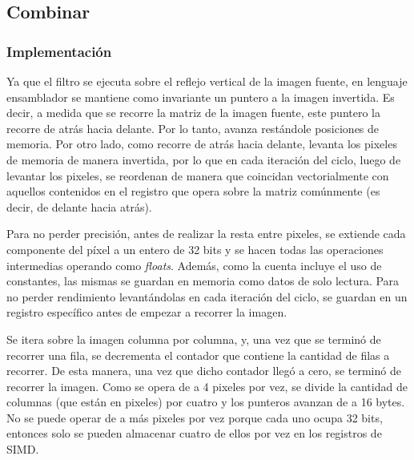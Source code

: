 \documentclass[a4paper]{article}
\begin{document}
\newpage
\subsection{Combinar}
\subsubsection{Implementación}
Ya que el filtro se ejecuta sobre el reflejo vertical de la imagen fuente, en lenguaje ensamblador se mantiene como invariante un puntero a la imagen invertida. Es decir, a medida que se recorre la matriz de la imagen fuente, este puntero la recorre de atrás hacia delante. Por lo tanto, avanza restándole posiciones de memoria. Por otro lado, como recorre de atrás hacia delante, levanta los pixeles de memoria de manera invertida, por lo que en cada iteración del ciclo, luego de levantar los pixeles, se reordenan de manera que coincidan vectorialmente con aquellos contenidos en el registro que opera sobre la matriz comúnmente (es decir, de delante hacia atrás).

Para no perder precisión, antes de realizar la resta entre pixeles, se extiende cada componente del píxel a un entero de 32 bits y se hacen todas las operaciones intermedias operando como \textit{floats}. Además, como la cuenta incluye el uso de constantes, las mismas se guardan en memoria como datos de solo lectura. Para no perder rendimiento levantándolas en cada iteración del ciclo, se guardan en un registro específico antes de empezar a recorrer la imagen.

Se itera sobre la imagen columna por columna, y, una vez que se terminó de recorrer una fila, se decrementa el contador que contiene la cantidad de filas a recorrer. De esta manera, una vez que dicho contador llegó a cero, se terminó de recorrer la imagen. Como se opera de a 4 pixeles por vez, se divide la cantidad de columnas (que están en pixeles) por cuatro y los punteros avanzan de a 16 bytes. No se puede operar de a más pixeles por vez porque cada uno ocupa 32 bits, entonces solo se pueden almacenar cuatro de ellos por vez en los registros de SIMD.
\bigskip
\end{document}

